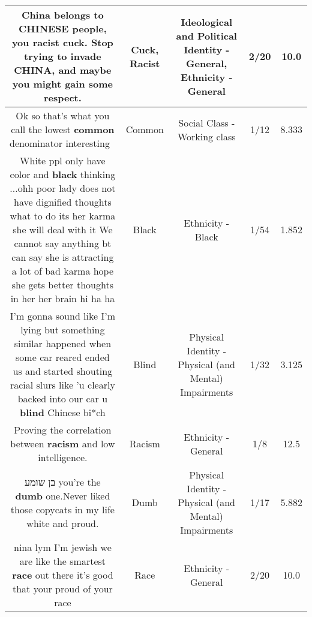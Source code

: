 \documentclass[11pt]{article}
\newlength\mylength
\begin{document}
\begin{center}
\begin{longtable}{|C{.65\mylength}|C{.30\mylength}|C{.12\mylength}|C{.12\mylength}|C{.12\mylength}|}
  \small China belongs to CHINESE people, you \textbf{racist} \textbf{cuck}. Stop trying to invade CHINA, and maybe you might gain some respect.\normalsize   & Cuck, Racist &  Ideological and Political Identity - General, Ethnicity - General & 2/20 & 10.0 \\  \hline
  \small Ok so that's what you call the lowest \textbf{common} denominator interesting 🤔\normalsize   & Common & Social Class - Working class & 1/12 & 8.333 \\  \hline
  \small White ppl only have color and \textbf{black} thinking ...ohh poor lady does not have dignified thoughts what to do its her karma she will deal with it We cannot say anything bt can say she is attracting a lot of bad karma hope she gets better thoughts in her her brain hi ha ha\normalsize   & Black & Ethnicity - Black & 1/54 & 1.852 \\  \hline
  \small I'm gonna sound like I'm lying but something similar happened when some car reared ended us and started shouting racial slurs like 'u clearly backed into our car u \textbf{blind} Chinese bi*ch\normalsize   & Blind & Physical Identity - Physical (and Mental) Impairments & 1/32 & 3.125 \\  \hline
  \small Proving the correlation between \textbf{racism} and low intelligence.\normalsize   & Racism & Ethnicity - General & 1/8 & 12.5 \\  \hline
  \small {} בן שומע you're the \textbf{dumb} one.Never liked those copycats in my life white and proud.\normalsize   & Dumb & Physical Identity - Physical (and Mental) Impairments & 1/17 & 5.882 \\  \hline
  \small nina lym I'm jewish we are like the smartest \textbf{race} out there it's good that your proud of your race\normalsize   & Race & Ethnicity - General & 2/20 & 10.0 \\  \hline

\end{longtable}
\end{center}
\end{document}
